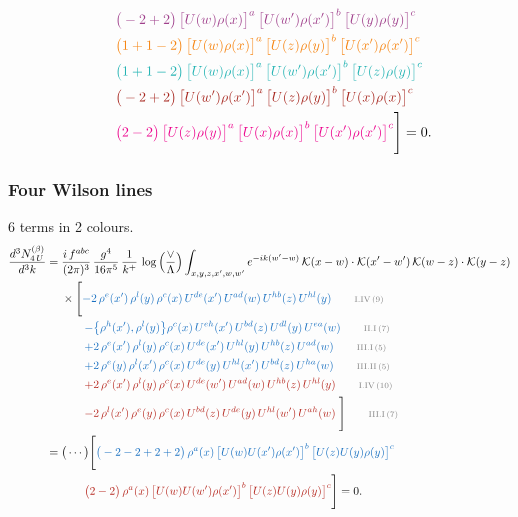 \documentclass[10pt]{article}
\begin{document}
\begin{align}
&\qquad{\color{DarkOrchid}\big(-2+2\big)\,\big[U(w)\rho(x)\big]^{a}\,\big[U(w')\rho(x')\big]^{b}\,\big[U(y)\rho(y)\big]^{c}}\notag\\
&\qquad{\color{BurntOrange}\big(1+1-2\big)\,\big[U(w)\rho(x)\big]^{a}\,\big[U(z)\rho(y)\big]^{b}\,\big[U(x')\rho(x')\big]^{c}}\notag\\
&\qquad{\color{TealBlue}\big(1+1-2\big)\,\big[U(w)\rho(x)\big]^{a}\,\big[U(w')\rho(x')\big]^{b}\,\big[U(z)\rho(y)\big]^{c}}\notag\\
&\qquad{\color{Mahogany}\big(-2+2\big)\,\big[U(w')\rho(x')\big]^{a}\,\big[U(z)\rho(y)\big]^{b}\,\big[U(x)\rho(x)\big]^{c}}\notag\\
&\qquad{\color{Magenta}\big(2-2\big)\,\big[U(z)\rho(y)\big]^{a}\,\big[U(x)\rho(x)\big]^{b}\,\big[U(x')\rho(x')\big]^{c}}\Bigg]=0.
\end{align}
\subsubsection{Four Wilson lines}
6 terms in 2 colours.
\begin{align}
\frac{d^{3}N^{(\beta)}_{4\,U}}{d^{3}k}={}&\frac{i\,f^{abc}}{(2\pi)^{3}}\,\frac{g^{4}}{16\pi^{5}}\,\frac{1}{k^{+}}\,\log\Big(\frac{\vee}{\Lambda}\Big)\int_{x,y,z,x',w,w'}e^{-ik(w'-w)}\,\mathcal{K}(x-w)\cdot\mathcal{K}(x'-w')\,\mathcal{K}(w-z)\cdot\mathcal{K}(y-z)\notag\\
&\times\Bigg[{\color{RoyalBlue}-2\,\rho^{e}(x')\,\rho^{l}(y)\,\rho^{c}(x)\, U^{de}(x')\,U^{ad}(w)\,U^{hb}(z)\,U^{hl}(y)}\tag*{\color{gray}\scriptsize I.IV\,(9)}\\
&\qquad{\color{RoyalBlue}-\big\{\rho^{h}(x'),\rho^{l}(y)\big\}\rho^{c}(x)\,U^{eh}(x')\,U^{bd}(z)\,U^{dl}(y)\,U^{ea}(w)}\tag*{\color{gray}\scriptsize II.I\,(7)}\\
&\qquad{\color{RoyalBlue}+2\,\rho^{e}(x')\,\rho^{l}(y)\, \rho^{c}(x)\, U^{de}(x')\,U^{hl}(y)\,U^{hb}(z)\,U^{ad}(w)}\tag*{\color{gray}\scriptsize III.I\,(5)}\\
&\qquad{\color{RoyalBlue}+2\,\rho^{e}(y)\,\rho^{l}(x')\, \rho^{c}(x)\, U^{de}(y)\,U^{hl}(x')\,U^{bd}(z)\,U^{ha}(w)}\tag*{\color{gray}\scriptsize III.II\,(5)}\\
&\qquad{\color{BrickRed}+2\,\rho^{e}(x')\,\rho^{l}(y)\,\rho^{c}(x)\, U^{de}(w')\,U^{ad}(w)\,U^{hb}(z)\,U^{hl}(y)}\tag*{\color{gray}\scriptsize I.IV\,(10)}\\
&\qquad{\color{BrickRed}-2\,\rho^{l}(x')\,\rho^{e}(y)\, \rho^{c}(x)\, U^{bd}(z)\,U^{de}(y)\,U^{hl}(w')\,U^{ah}(w)}\;\Bigg]\tag*{\color{gray}\scriptsize III.I\,(7)}\\
={}&\big(\cdots\big)\Bigg[{\color{RoyalBlue}\big(-2-2+2+2\big)\,\rho^{a}(x)\,\big[U(w)U(x')\rho(x')\big]^{b}\,\big[U(z)U(y)\rho(y)\big]^{c}}\notag\\
&\qquad{\color{BrickRed}\big(2-2\big)\,\rho^{a}(x)\,\big[U(w)U(w')\rho(x')\big]^{b}\,\big[U(z)U(y)\rho(y)\big]^{c}}\Bigg]=0.
\end{align}
\end{document}
